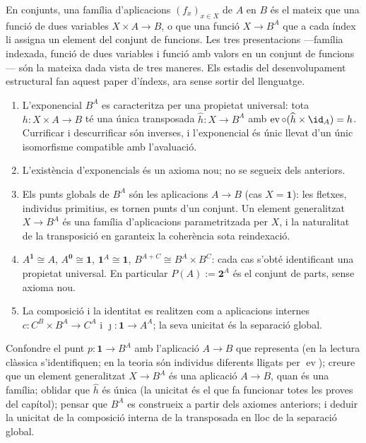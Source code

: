 \begin{observacio}\label{obs:families-classica}
En conjunts, una família d'aplicacions \((f_x)_{x\in X}\) de \(A\) en
\(B\) és el mateix que una funció de dues variables \(X\times A\to B\), o
que una funció \(X\to B^A\) que a cada índex li assigna un element del
conjunt de funcions. Les tres presentacions ---família indexada, funció de
dues variables i funció amb valors en un conjunt de funcions--- són la
mateixa dada vista de tres maneres. Els estadis del desenvolupament
estructural fan aquest paper d'índexs, ara sense sortir del llenguatge.
\end{observacio}

\begin{resumcap}
\begin{enumerate}
  \item L'exponencial \(B^A\) es caracteritza per una propietat universal: tota \(h\colon X\times A\to B\) té una única transposada \(\widehat h\colon X\to B^A\) amb \(\operatorname{ev}\circ(\widehat h\times\id_A)=h\). Currificar i descurrificar són inverses, i l'exponencial és únic llevat d'un únic isomorfisme compatible amb l'avaluació.
  \item L'existència d'exponencials és un axioma nou; no se segueix dels anteriors.
  \item Els punts globals de \(B^A\) són les aplicacions \(A\to B\) (cas \(X=\mathbf1\)): les fletxes, individus primitius, es tornen punts d'un conjunt. Un element generalitzat \(X\to B^A\) és una família d'aplicacions parametritzada per \(X\), i la naturalitat de la transposició en garanteix la coherència sota reindexació.
  \item \(A^{\mathbf1}\cong A\), \(A^{\mathbf0}\cong\mathbf1\), \(\mathbf1^A\cong\mathbf1\), \(B^{A+C}\cong B^A\times B^C\): cada cas s'obté identificant una propietat universal. En particular \(P(A):=\mathbf2^A\) és el conjunt de parts, sense axioma nou.
  \item La composició i la identitat es realitzen com a aplicacions internes \(c\colon C^B\times B^A\to C^A\) i \(\jmath\colon\mathbf1\to A^A\); la seva unicitat és la separació global.
\end{enumerate}
 Confondre el punt \(p\colon\mathbf1\to B^A\) amb l'aplicació \(A\to B\) que representa (en la lectura clàssica s'identifiquen; en la teoria són individus diferents lligats per \(\operatorname{ev}\)); creure que un element generalitzat \(X\to B^A\) és una aplicació \(A\to B\), quan és una família; oblidar que \(\widehat h\) és única (la unicitat és el que fa funcionar totes les proves del capítol); pensar que \(B^A\) es construeix a partir dels axiomes anteriors; i deduir la unicitat de la composició interna de la transposada en lloc de la separació global.

\end{resumcap}
